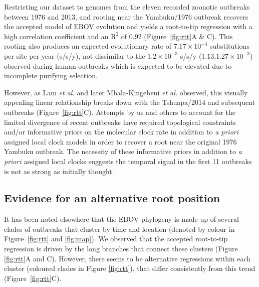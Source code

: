 \documentclass[11pt,a4paper]{article}
\begin{document}
Restricting our dataset to genomes from the eleven recorded zoonotic outbreaks between 1976 and 2013, and rooting near the Yambuku/1976 outbreak recovers the accepted model of EBOV evolution and yields a root-to-tip regression with a high correlation coefficient and an $\text{R}^2$ of 0.92 (Figure~\ref{fig:rtt}A \& C).
This rooting also produces an expected evolutionary rate of $7.17 \times 10^{-4}$ substitutions per site per year (s/s/y), not dissimilar to the $1.2 \times 10^{-3}$ s/s/y ($1.13$,$1.27 \times 10^{-3}$) observed during human outbreaks \cite{Holmes2016-wp} which is expected to be elevated due to incomplete purifying selection\cite{Holmes2016-wp,Ghafari2022-wl}.

However, as Lam \textit{et al.} \cite{Lam2015-gx} and later Mbala-Kingebeni \textit{et al.} \cite{Mbala-Kingebeni2019-bo} observed, this visually appealing linear relationship breaks down with the Tshuapa/2014 and subsequent outbreaks (Figure~\ref{fig:rtt}C).
Attempts by us \cite{Rambaut2019-yy} and others \cite{Mbala-Kingebeni2019-bo} to account for the limited divergence of recent outbreaks have required topological constraints and/or informative priors on the molecular clock rate in addition to \emph{a priori} assigned local clock models in order to recover a root near the original 1976 Yambuku outbreak.
The necessity of these informative priors in addition to \emph{a priori} assigned local clocks suggests the temporal signal in the first 11 outbreaks is not as strong as initially thought.


\subsection*{Evidence for an alternative root position}

It has been noted elsewhere \cite{Mbala-Kingebeni2019-bo} that the EBOV phylogeny is made up of several clades of outbreaks that cluster by time and location (denoted by colour in Figure~\ref{fig:rtt} and \ref{fig:map}).
We observed that the accepted root-to-tip regression is driven by the long branches that connect these clusters (Figure \ref{fig:rtt}A and C).
However, there seems to be alternative regressions within each cluster (coloured clades in Figure \ref{fig:rtt}), that differ consistently from this trend (Figure~\ref{fig:rtt}C).
\end{document}
